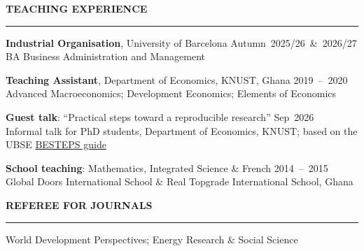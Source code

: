 \documentclass{resume} %
\def\sectionskip{\vspace{4pt}}
\def\sectionlineskip{\smallskip}
\renewenvironment{rSection}[1]{%
  \sectionskip
  \MakeUppercase{{\bf #1}}%
  \sectionlineskip
  \hrule
  \begin{list}{}{\setlength{\leftmargin}{0em}\setlength{\topsep}{5pt}\setlength{\itemsep}{0pt}\setlength{\parsep}{0pt}}%
  \item[]
}{%
  \end{list}
}
\newcommand{\when}[1]{\hfill\mbox{#1}}
\begin{document}
\begin{rSection}{Teaching Experience}
\textbf{Industrial Organisation}, University of Barcelona \when{Autumn 2025/26 \& 2026/27}\\
{\small BA Business Administration and Management}

\textbf{Teaching Assistant}, Department of Economics, KNUST, Ghana \when{2019 -- 2020}\\
{\small Advanced Macroeconomics; Development Economics; Elements of Economics}

\textbf{Guest talk}: ``Practical steps toward a reproducible research'' \when{Sep 2026}\\
{\small Informal talk for PhD students, Department of Economics, KNUST; based on the UBSE \href{https://hdl.handle.net/2445/223454}{BESTEPS guide}}

\textbf{School teaching}: Mathematics, Integrated Science \& French \when{2014 -- 2015}\\
{\small Global Doors International School \& Real Topgrade International School, Ghana}
\end{rSection}


\begin{rSection}{Referee for Journals}
World Development Perspectives; Energy Research \& Social Science
\end{rSection}


\end{document}
